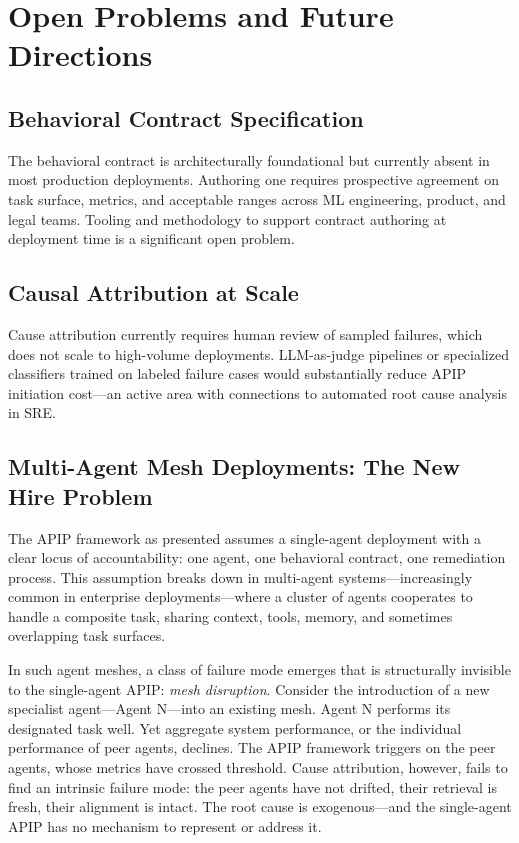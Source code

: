 \section{Open Problems and Future Directions}
\label{sec:open-problems}

\subsection{Behavioral Contract Specification}
\label{subsec:contract-spec}

The behavioral contract is architecturally foundational but currently absent in
most production deployments. Authoring one requires prospective agreement on
task surface, metrics, and acceptable ranges across ML engineering, product,
and legal teams. Tooling and methodology to support contract authoring at
deployment time is a significant open problem.

\subsection{Causal Attribution at Scale}
\label{subsec:attribution-scale}

Cause attribution currently requires human review of sampled failures, which
does not scale to high-volume deployments. LLM-as-judge pipelines or
specialized classifiers trained on labeled failure cases would substantially
reduce APIP initiation cost---an active area with connections to automated root
cause analysis in SRE.

\subsection{Multi-Agent Mesh Deployments: The New Hire Problem}
\label{subsec:mesh}

The APIP framework as presented assumes a single-agent deployment with a clear
locus of accountability: one agent, one behavioral contract, one remediation
process. This assumption breaks down in multi-agent systems---increasingly
common in enterprise deployments---where a cluster of agents cooperates to
handle a composite task, sharing context, tools, memory, and sometimes
overlapping task surfaces.

In such agent meshes, a class of failure mode emerges that is structurally
invisible to the single-agent APIP: \emph{mesh disruption}. Consider the
introduction of a new specialist agent---Agent N---into an existing mesh. Agent
N performs its designated task well. Yet aggregate system performance, or the
individual performance of peer agents, declines. The APIP framework triggers on
the peer agents, whose metrics have crossed threshold. Cause attribution,
however, fails to find an intrinsic failure mode: the peer agents have not
drifted, their retrieval is fresh, their alignment is intact. The root cause is
exogenous---and the single-agent APIP has no mechanism to represent or address
it.

